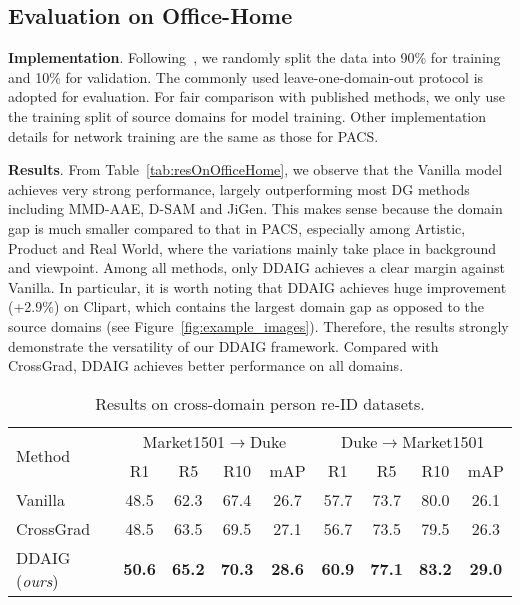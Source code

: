 \documentclass[letterpaper]{article}
\newcommand{\keypoint}[1]{\vspace{0.1cm}\noindent\textbf{#1}}
\newcommand{\tableCellHeight}{1.1}
\begin{document}
\subsection{Evaluation on Office-Home}

\keypoint{Implementation}.
Following~\cite{d2018domain,cvpr19JiGen}, we randomly split the data into 90\% for training and 10\% for validation. The commonly used leave-one-domain-out protocol is adopted for evaluation. For fair comparison with published methods, we only use the training split of source domains for model training. Other implementation details for network training are the same as those for PACS.

\keypoint{Results}.
From Table~\ref{tab:resOnOfficeHome}, we observe that the Vanilla model achieves very strong performance, largely outperforming most DG methods including MMD-AAE, D-SAM and JiGen. This makes sense because the domain gap is much smaller compared to that in PACS, especially among Artistic, Product and Real World, where the variations mainly take place in background and viewpoint. Among all methods, only DDAIG achieves a clear margin against Vanilla. In particular, it is worth noting that DDAIG achieves huge improvement (+2.9\%) on Clipart, which contains the largest domain gap as opposed to the source domains (see Figure~\ref{fig:example_images}). Therefore, the results strongly demonstrate the versatility of our DDAIG framework. Compared with CrossGrad, DDAIG achieves better performance on all domains.


\begin{table}[t]
\setlength{\tabcolsep}{2.8pt}
\renewcommand{\arraystretch}{\tableCellHeight}
\centering
\footnotesize
\caption{Results on cross-domain person re-ID datasets.}
\label{tab:xdomainreid}
\begin{tabular}{l | c c c c | c c c c}
\hline
\multirow{2}{*}{Method} & \multicolumn{4}{c|}{Market1501$\rightarrow$Duke} & \multicolumn{4}{c}{Duke$\rightarrow$Market1501} \\
 & R1 & R5 & R10 & mAP & R1 & R5 & R10 & mAP \\
\hline
Vanilla & 48.5 & 62.3 & 67.4 & 26.7 & {57.7} & 73.7 & {80.0} & 26.1 \\
CrossGrad & 48.5 & 63.5 & {69.5} & 27.1 & 56.7 & 73.5 & 79.5 & {26.3} \\
DDAIG (\emph{ours}) & \textbf{50.6} & \textbf{65.2} & \textbf{70.3} & \textbf{28.6} & \textbf{60.9} & \textbf{77.1} & \textbf{83.2} & \textbf{29.0} \\
\hline
\end{tabular}
\vspace{-0.1cm}
\end{table}
\end{document}
